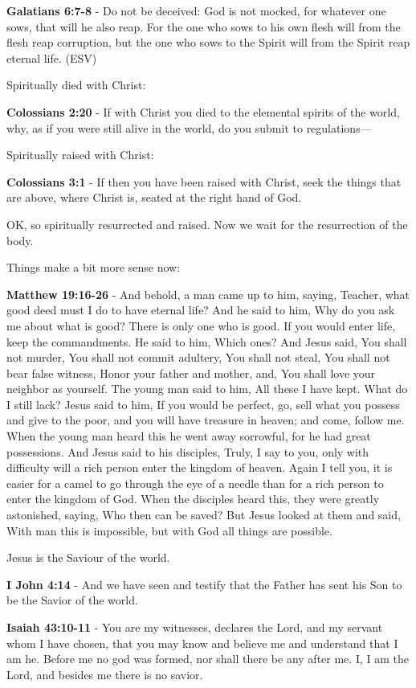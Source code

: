 \documentclass[11pt]{article}
\begin{document}
\textbf{Galatians 6:7-8} - Do not be deceived: God is not mocked, for whatever one sows, that will he also reap. For the one who sows to his own flesh will from the flesh reap corruption, but the one who sows to the Spirit will from the Spirit reap eternal life. (ESV)

Spiritually died with Christ:

\textbf{Colossians 2:20} - If with Christ you died to the elemental spirits of the world, why, as if you were still alive in the world, do you submit to regulations—

Spiritually raised with Christ:

\textbf{Colossians 3:1} - If then you have been raised with Christ, seek the things that are above, where Christ is, seated at the right hand of God.

OK, so spiritually resurrected and raised. Now we wait for the resurrection of the body.

Things make a bit more sense now:

\textbf{Matthew 19:16-26} - And behold, a man came up to him, saying, Teacher, what good deed must I do to have eternal life? And he said to him, Why do you ask me about what is good? There is only one who is good. If you would enter life, keep the commandments. He said to him, Which ones? And Jesus said, You shall not murder, You shall not commit adultery, You shall not steal, You shall not bear false witness, Honor your father and mother, and, You shall love your neighbor as yourself. The young man said to him, All these I have kept. What do I still lack? Jesus said to him, If you would be perfect, go, sell what you possess and give to the poor, and you will have treasure in heaven; and come, follow me. When the young man heard this he went away sorrowful, for he had great possessions. And Jesus said to his disciples, Truly, I say to you, only with difficulty will a rich person enter the kingdom of heaven. Again I tell you, it is easier for a camel to go through the eye of a needle than for a rich person to enter the kingdom of God. When the disciples heard this, they were greatly astonished, saying, Who then can be saved? But Jesus looked at them and said, With man this is impossible, but with God all things are possible.

Jesus is the Saviour of the world.

\textbf{I John 4:14} - And we have seen and testify that the Father has sent his Son to be the Savior of the world.

\textbf{Isaiah 43:10-11} - You are my witnesses, declares the Lord, and my servant whom I have chosen, that you may know and believe me and understand that I am he. Before me no god was formed, nor shall there be any after me. I, I am the Lord, and besides me there is no savior.
\end{document}
